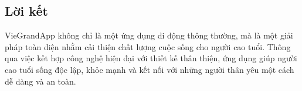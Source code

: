 \documentclass[12pt,a4paper]{article}
\begin{document}
\subsection{Lời kết}
VieGrandApp không chỉ là một ứng dụng di động thông thường, mà là một giải pháp toàn diện nhằm cải thiện chất lượng cuộc sống cho người cao tuổi. Thông qua việc kết hợp công nghệ hiện đại với thiết kế thân thiện, ứng dụng giúp người cao tuổi sống độc lập, khỏe mạnh và kết nối với những người thân yêu một cách dễ dàng và an toàn.
\end{document}
